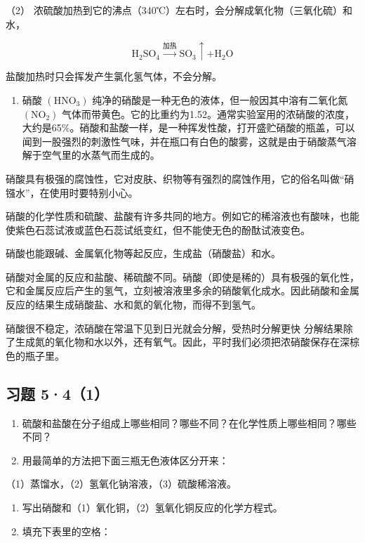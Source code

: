 （2）
浓硫酸加热到它的沸点（340℃）左右时，会分解成氧化物（三氧化硫）和水，

\[
\mathrm{H}_{2}\mathrm{SO}_{4}\xrightarrow{\text{加热}}\mathrm{SO}_{3}\uparrow+\mathrm{H}_{2}\mathrm{O}
\]

盐酸加热时只会挥发产生氯化氢气体，不会分解。

\begin{enumerate}[start=3]
\item
  硝酸 \(\left(\mathrm{HNO}_{3}\right)\)
  纯净的硝酸是一种无色的液体，但一般因其中溶有二氧化氮
  \(\left(\mathrm{NO}_{2}\right)\)
  气体而带黄色。它的比重约为1.52。通常实验室用的浓硝酸的浓度，大约是65\%。硝酸和盐酸一样，是一种挥发性酸，打开盛贮硝酸的瓶盖，可以闻到一股强烈的刺激性气味，并在瓶口有白色的酸雾，这就是由于硝酸蒸气溶解于空气里的水蒸气而生成的。
\end{enumerate}

硝酸具有极强的腐蚀性，它对皮肤、织物等有强烈的腐蚀作用，它的俗名叫做``硝镪水''，在使用时要特别小心。

硝酸的化学性质和硫酸、盐酸有许多共同的地方。例如它的稀溶液也有酸味，也能使紫色石蕊试液或蓝色石蕊试纸变红，但不能使无色的酚酞试液变色。

硝酸也能跟碱、金属氧化物等起反应，生成盐（硝酸盐）和水。

硝酸对金属的反应和盐酸、稀硫酸不同。硝酸（即使是稀的）具有极强的氧化性，它和金属反应后产生的氢气，立刻被溶液里多余的硝酸氧化成水。因此硝酸和金属反应的结果生成硝酸盐、水和氮的氧化物，而得不到氢气。

硝酸很不稳定，浓硝酸在常温下见到日光就会分解，受热时分解更快
分解结果除了生成氮的氧化物和水以外，还有氧气。因此，平时我们必须把浓硝酸保存在深棕色的瓶子里。

\subsection{习题 5·4（1）}

\begin{enumerate}
\item
  硫酸和盐酸在分子组成上哪些相同？哪些不同？在化学性质上哪些相同？哪些不同？
\item
  用最简单的方法把下面三瓶无色液体区分开来：
\end{enumerate}

（1）蒸馏水，（2）氢氧化钠溶液，（3）硫酸稀溶液。

\begin{enumerate}[start=3]
\item
  写出硝酸和（1）氧化铜，（2）氢氧化铜反应的化学方程式。
\item
  填充下表里的空格：
\end{enumerate}

